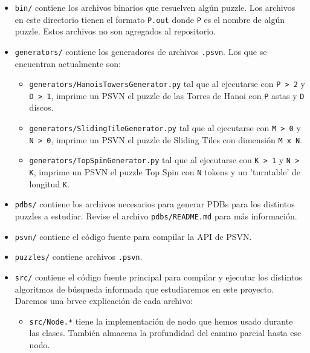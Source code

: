 \documentclass[a4paper,10pt]{article}
\begin{document}
  \begin{itemize}
    \item \verb|bin/| contiene los archivos binarios que resuelven alg\'un puzzle.
    Los archivos en este directorio tienen el formato \verb|P.out| donde \verb|P|
    es el nombre de alg\'un puzzle. Estos archivos no son agregados al repositorio.

    \item \verb|generators/| contiene los generadores de archivos \verb|.psvn|.
    Los que se encuentran actualmente son:
    \begin{itemize}
      \item \verb|generators/HanoisTowersGenerator.py| tal que al ejecutarse con 
      \verb|P > 2| y \verb|D > 1|, imprime un PSVN el puzzle de las Torres 
      de Hanoi con \verb|P| astas y \verb|D| discos.

      \item \verb|generators/SlidingTileGenerator.py| tal que al ejecutarse con 
      \verb|M > 0| y \verb|N > 0|, imprime un PSVN el puzzle de Sliding 
      Tiles con dimensi\'on \verb|M x N|.

      \item \verb|generators/TopSpinGenerator.py| tal que al ejecutarse con 
      \verb|K > 1| y \verb|N > K|, imprime un PSVN el puzzle Top Spin con 
      \verb|N| tokens y un 'turntable' de longitud \verb|K|.
    \end{itemize}

    \item \verb|pdbs/| contiene los archivos necesarios para generar PDBs para los 
    distintos puzzles a estudiar. Revise el archivo \verb|pdbs/README.md| para m\'as
    informaci\'on.

    \item \verb|psvn/| contiene el c\'odigo fuente para compilar la API de PSVN.
    
    \item \verb|puzzles/| contiene archivos \verb|.psvn|.

    \item \verb|src/| contiene el c\'odigo fuente principal para compilar y ejecutar 
    los distintos algoritmos de b\'usqueda informada que estudiaremos en este proyecto.
    Daremos una brvee explicaci\'on de cada archivo:
    \begin{itemize}
      \item \verb|src/Node.*| tiene la implementaci\'on de nodo que hemos usado durante 
      las clases. Tambi\'en almacena la profundidad del camino parcial hasta ese nodo.


\end{itemize}
\end{itemize}
\end{document}
